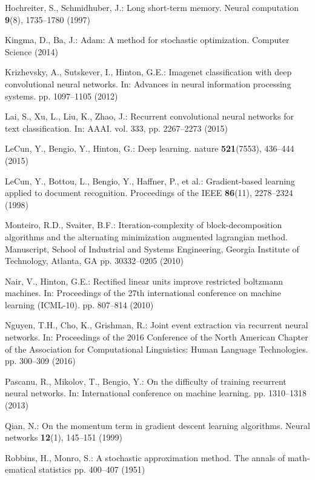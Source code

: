 \documentclass[twoside]{article}
\begin{document}
\begin{multicols}{2}
\begin{thebibliography}{99}
Hochreiter, S., Schmidhuber, J.: Long short-term memory. Neural computation \textbf{9}(8), 1735--1780 (1997)

Kingma, D., Ba, J.: Adam: A method for stochastic optimization. Computer Science (2014)

Krizhevsky, A., Sutskever, I., Hinton, G.E.: Imagenet classification with deep convolutional neural networks. In: Advances in neural information processing systems. pp. 1097--1105 (2012)

Lai, S., Xu, L., Liu, K., Zhao, J.: Recurrent convolutional neural networks for text classification. In: AAAI. vol. 333, pp. 2267--2273 (2015)

LeCun, Y., Bengio, Y., Hinton, G.: Deep learning. nature \textbf{521}(7553), 436--444 (2015)

LeCun, Y., Bottou, L., Bengio, Y., Haffner, P., et al.: Gradient-based learning applied to document recognition. Proceedings of the IEEE \textbf{86}(11), 2278--2324 (1998)

Monteiro, R.D., Svaiter, B.F.: Iteration-complexity of block-decomposition algorithms and the alternating minimization augmented lagrangian method. Manuscript, School of Industrial and Systems Engineering, Georgia Institute of Technology, Atlanta, GA pp. 30332--0205 (2010)

Nair, V., Hinton, G.E.: Rectified linear units improve restricted boltzmann machines. In: Proceedings of the 27th international conference on machine learning
(ICML-10). pp. 807--814 (2010)

Nguyen, T.H., Cho, K., Grishman, R.: Joint event extraction via recurrent neural
networks. In: Proceedings of the 2016 Conference of the North American Chapter of the Association for Computational Linguistics: Human Language Technologies. pp. 300--309 (2016)

Pascanu, R., Mikolov, T., Bengio, Y.: On the difficulty of training recurrent neural networks. In: International conference on machine learning. pp. 1310--1318 (2013)

Qian, N.: On the momentum term in gradient descent learning algorithms. Neural
networks \textbf{12}(1), 145--151 (1999)

Robbins, H., Monro, S.: A stochastic approximation method. The annals of math-
ematical statistics pp. 400--407 (1951)


\end{thebibliography}
\end{multicols}
\end{document}
